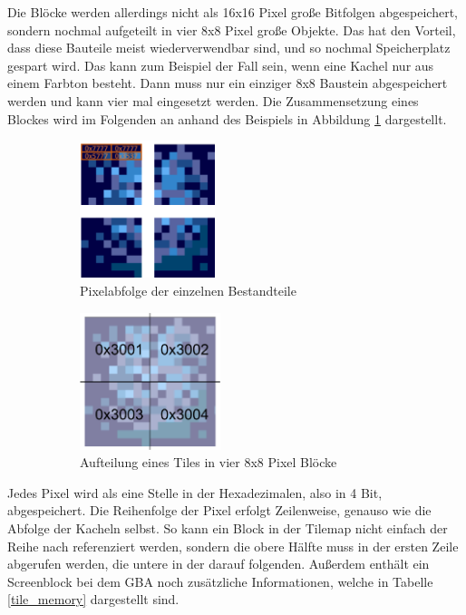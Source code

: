 Die Blöcke werden allerdings nicht als 16x16 Pixel große Bitfolgen abgespeichert, sondern nochmal aufgeteilt in vier 8x8 Pixel große Objekte. Das hat den Vorteil, dass diese Bauteile meist wiederverwendbar sind, und so nochmal Speicherplatz gespart wird. Das kann zum Beispiel der Fall sein, wenn eine Kachel nur aus einem Farbton besteht. Dann muss nur ein einziger 8x8 Baustein abgespeichert werden und kann vier mal eingesetzt werden. Die Zusammensetzung eines Blockes wird im Folgenden an anhand des Beispiels in Abbildung \ref{tile_quarter} dargestellt.
\begin{figure}[H]
	\centering
	\begin{subfigure}{.5\textwidth}
		\centering
		\includegraphics[height=40mm]{img/tile_pixels.png}
		\caption{Pixelabfolge der einzelnen Bestandteile}
	\end{subfigure}%
	\begin{subfigure}{.5\textwidth}
		\centering
		\includegraphics[height=40mm]{img/tile_blue_quarter.png}
		\caption{Aufteilung eines Tiles in vier 8x8 Pixel Blöcke}
	\end{subfigure}
	\caption[Bestandteile eines Blocks]{}
	\label{tile_quarter}
\end{figure}
Jedes Pixel wird als eine Stelle in der Hexadezimalen, also in 4 Bit, abgespeichert. Die Reihenfolge der Pixel erfolgt Zeilenweise, genauso wie die Abfolge der Kacheln selbst. So kann ein Block in der Tilemap nicht einfach der Reihe nach referenziert werden, sondern die obere Hälfte muss in der ersten Zeile abgerufen werden, die untere in der darauf folgenden. Außerdem enthält ein Screenblock bei dem \ac{GBA} noch zusätzliche Informationen, welche in Tabelle \ref{tile_memory} dargestellt sind.
